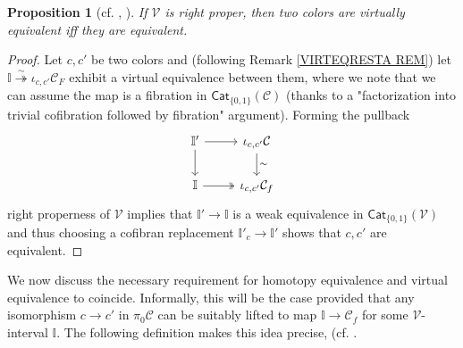 \documentclass[a4paper,10pt
,draft
]{article}%
\numberwithin{equation}{section}
\numberwithin{figure}{section}
\newtheorem{proposition}[equation]{Proposition}%
\theoremstyle{definition} %
\newcommand{\V}{\ensuremath{\mathcal V}}
\newcommand{\C}{\ensuremath{\mathcal C}}
\newcommand{\1}{\ensuremath{\mathbbm 1}}%
\begin{document}
\begin{proposition}[{cf. \cite[4.12]{Cav}, \cite[2.10]{BM13}}] \label{RIGHTPROPER PROP}
If $\V$ is right proper, then two colors are virtually equivalent iff they are equivalent. 
\end{proposition}

\begin{proof}
Let $c,c'$ be two colors and (following Remark \ref{VIRTEQRESTA REM})
let $\mathbb{I} \overset{\sim}{\twoheadrightarrow} \iota_{c,c'} \mathcal{C}_F$
exhibit a virtual equivalence between them, where we note
that we can assume the map is a fibration in $\mathsf{Cat}_{\{0,1\}}(\C)$
(thanks to a "factorization into trivial cofibration followed by fibration" argument).
Forming the pullback
\begin{equation}
\begin{tikzcd}
		 \mathbb{I}' \ar{r} \arrow{d}
	&
		\iota_{c,c'} \mathcal{C} \arrow{d}{\sim}
\\
		\mathbb{I} \ar[twoheadrightarrow]{r} 
	&
		\iota_{c,c'}\mathcal{C}_f
\end{tikzcd}
\end{equation}
right properness of $\V$ implies 
that $\mathbb{I}' \to \mathbb{I}$ is a weak equivalence in 
$\mathsf{Cat}_{\{0,1\}}(\V)$
and thus choosing a cofibran replacement
$\mathbb{I}'_c \to \mathbb{I}'$
shows that $c,c'$ are equivalent.
\end{proof}





We now discuss the necessary requirement for homotopy equivalence and virtual equivalence to coincide.
Informally, this will be the case provided that any isomorphism 
$c \to c'$ in $\pi_0 \mathcal{C}$
can be suitably lifted to map 
$\mathbb{I} \to \C_f$ for some $\V$-interval $\mathbb{I}$.
The following definition makes this idea precise, (cf. \cite[\S 2]{BM13}.
\end{document}
